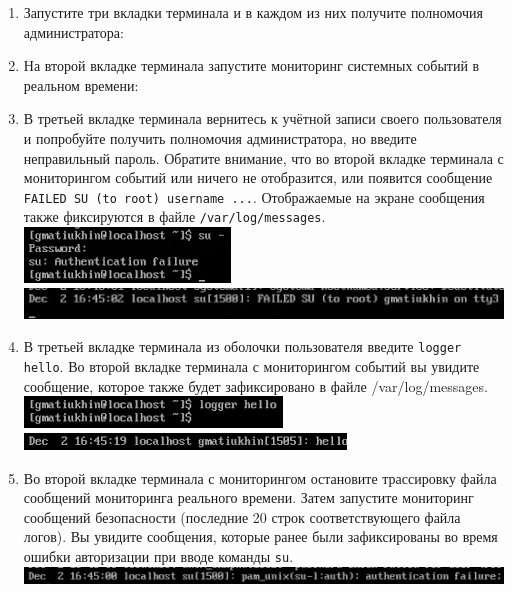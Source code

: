 \documentclass[12pt]{article}
\begin{document}
\begin{enumerate}
	\item Запустите три вкладки терминала и в каждом из них получите полномочия администратора:
	\item На второй вкладке терминала запустите мониторинг системных событий в реальном времени:
	\item В третьей вкладке терминала вернитесь к учётной записи своего пользователя и попробуйте получить полномочия администратора, но введите неправильный пароль. Обратите внимание, что во второй вкладке терминала с мониторингом событий или ничего не отобразится, или появится сообщение \texttt{FAILED SU (to root) username ...}. Отображаемые на экране сообщения также фиксируются в файле \texttt{/var/log/messages}.
	      \\\includegraphics{1.png}
	      \\\includegraphics{2.png}
	\item В третьей вкладке терминала из оболочки пользователя введите \texttt{logger hello}. Во второй вкладке терминала с мониторингом событий вы увидите сообщение, которое также будет зафиксировано в файле /var/log/messages.
	      \\\includegraphics{3.png}
	      \\\includegraphics{4.png}
	\item Во второй вкладке терминала с мониторингом остановите трассировку файла сообщений мониторинга реального времени. Затем запустите мониторинг сообщений безопасности (последние 20 строк соответствующего файла логов). Вы увидите сообщения, которые ранее были зафиксированы во время ошибки авторизации при вводе команды \texttt{su}.
	      \\\includegraphics{5.png}
\end{enumerate}
\end{document}
